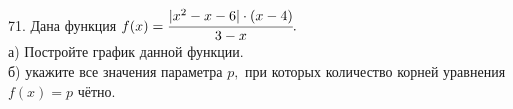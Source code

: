 71. Дана функция $f(x)=\cfrac{|x^2-x-6|\cdot(x-4)}{3-x}.$\\
а) Постройте график данной функции.\\
б) укажите все значения параметра $p,$ при которых количество корней уравнения $f(x)=p$ чётно.\\
